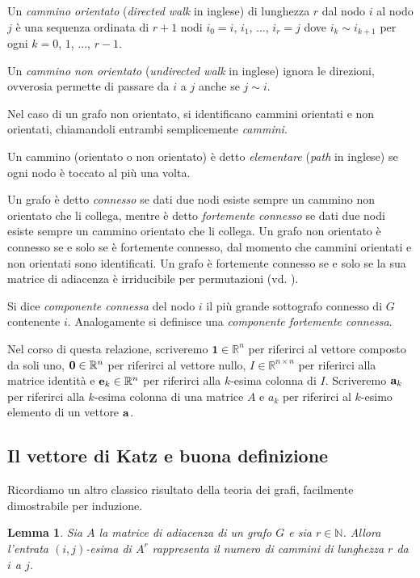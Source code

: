 \documentclass[a4paper]{article}
\newcommand{\NN}{\mathbb{N}}
\newcommand{\RR}{\mathbb{R}}
\newcommand{\evec}{{\bf e}}
\newcommand{\avec}{{\bf a}}
\newcommand{\bone}{\mathbf{1}}
\newcommand{\bzero}{{\bf 0}}
\newtheorem{lemma}{Lemma}
\begin{document}
Un \textit{cammino orientato} (\textit{directed walk} in inglese) di lunghezza $r$ dal nodo $i$ al nodo $j$ è una sequenza
ordinata di $r+1$ nodi $i_0 = i$, $i_1$, ..., $i_r = j$ dove $i_k \sim i_{k+1}$ per ogni $k = 0$, $1$, ..., $r-1$.

Un \textit{cammino non orientato} (\textit{undirected walk} in inglese) ignora le direzioni, ovverosia permette di passare da $i$ a $j$
anche se $j \sim i$.

Nel caso di un grafo non orientato, si identificano cammini orientati
e non orientati, chiamandoli entrambi semplicemente \textit{cammini}.

Un cammino (orientato o non orientato) è detto \textit{elementare} (\textit{path} in inglese) se ogni nodo è toccato al più una volta.

Un grafo è detto \textit{connesso} se dati due nodi esiste sempre un cammino non orientato che li collega, mentre è detto \textit{fortemente connesso} se dati due nodi esiste sempre un cammino
orientato che li collega. Un grafo non orientato è connesso se e solo se è fortemente connesso, dal momento che cammini orientati e non orientati sono
identificati. Un grafo è fortemente connesso se e solo se la sua matrice di adiacenza è
irriducibile per permutazioni (vd. \cite[Theorem 3.2.1]{brualdi1991combinatorial}).

Si dice \textit{componente connessa} del nodo $i$ il più grande sottografo
connesso di $G$ contenente $i$. Analogamente si definisce una \textit{componente fortemente connessa}. 

Nel corso di questa relazione, scriveremo
$\bone \in \RR^n$ per riferirci al vettore composto da soli uno, $\bzero \in \RR^n$ per riferirci al vettore nullo, $I \in \RR^{n \times n}$ per riferirci
alla matrice identità e $\evec_k \in \RR^n$ per riferirci alla $k$-esima colonna di $I$. Scriveremo $\avec_k$ per riferirci alla $k$-esima colonna di una matrice $A$ e $a_k$ per riferirci al $k$-esimo elemento di un vettore $\avec$.

\subsection{Il vettore di Katz e buona definizione}

Ricordiamo un altro classico risultato della teoria dei grafi, facilmente
dimostrabile per induzione.

\begin{lemma}
    \label{lemma:numero_cammini}
    Sia $A$ la matrice di adiacenza di un grafo $G$ e sia $r \in \NN$. Allora l'entrata $(i,j)$-esima di $A^r$ rappresenta il numero di cammini
    di lunghezza $r$ da $i$ a $j$.
\end{lemma}
\end{document}
